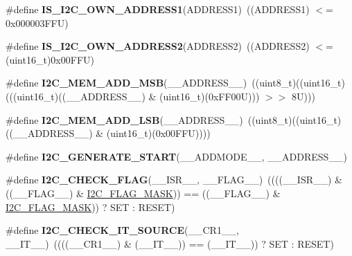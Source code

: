 \begin{DoxyCompactItemize}
\item 
\mbox{\label{group___i2_c___private___macro_gad84e8b9523d45b6105b4d5cb68994a79}} 
\#define {\bfseries I\+S\+\_\+\+I2\+C\+\_\+\+O\+W\+N\+\_\+\+A\+D\+D\+R\+E\+S\+S1}(A\+D\+D\+R\+E\+S\+S1)~((A\+D\+D\+R\+E\+S\+S1) $<$= 0x000003\+F\+F\+U)
\item 
\mbox{\label{group___i2_c___private___macro_ga83001d53612b83ee90730d3bb2732537}} 
\#define {\bfseries I\+S\+\_\+\+I2\+C\+\_\+\+O\+W\+N\+\_\+\+A\+D\+D\+R\+E\+S\+S2}(A\+D\+D\+R\+E\+S\+S2)~((A\+D\+D\+R\+E\+S\+S2) $<$= (uint16\+\_\+t)0x00\+F\+F\+U)
\item 
\mbox{\label{group___i2_c___private___macro_ga2e42fa55be22240dc5a54a0304d01cfb}} 
\#define {\bfseries I2\+C\+\_\+\+M\+E\+M\+\_\+\+A\+D\+D\+\_\+\+M\+SB}(\+\_\+\+\_\+\+A\+D\+D\+R\+E\+S\+S\+\_\+\+\_\+)~((uint8\+\_\+t)((uint16\+\_\+t)(((uint16\+\_\+t)((\+\_\+\+\_\+\+A\+D\+D\+R\+E\+S\+S\+\_\+\+\_\+) \& (uint16\+\_\+t)(0x\+F\+F00\+U))) $>$$>$ 8\+U)))
\item 
\mbox{\label{group___i2_c___private___macro_ga9c8f1a763307d0c37bb4e2dcfdf3bb9f}} 
\#define {\bfseries I2\+C\+\_\+\+M\+E\+M\+\_\+\+A\+D\+D\+\_\+\+L\+SB}(\+\_\+\+\_\+\+A\+D\+D\+R\+E\+S\+S\+\_\+\+\_\+)~((uint8\+\_\+t)((uint16\+\_\+t)((\+\_\+\+\_\+\+A\+D\+D\+R\+E\+S\+S\+\_\+\+\_\+) \& (uint16\+\_\+t)(0x00\+F\+F\+U))))
\item 
\#define {\bfseries I2\+C\+\_\+\+G\+E\+N\+E\+R\+A\+T\+E\+\_\+\+S\+T\+A\+RT}(\+\_\+\+\_\+\+A\+D\+D\+M\+O\+D\+E\+\_\+\+\_\+,  \+\_\+\+\_\+\+A\+D\+D\+R\+E\+S\+S\+\_\+\+\_\+)
\item 
\mbox{\label{group___i2_c___private___macro_ga31873e0595e29c80cffe00c2d2e073ab}} 
\#define {\bfseries I2\+C\+\_\+\+C\+H\+E\+C\+K\+\_\+\+F\+L\+AG}(\+\_\+\+\_\+\+I\+S\+R\+\_\+\+\_\+,  \+\_\+\+\_\+\+F\+L\+A\+G\+\_\+\+\_\+)~((((\+\_\+\+\_\+\+I\+S\+R\+\_\+\+\_\+) \& ((\+\_\+\+\_\+\+F\+L\+A\+G\+\_\+\+\_\+) \& \mbox{\hyperlink{group___i2_c___exported___macros_gafbc0a6e4113be03100fbae1314a8b395}{I2\+C\+\_\+\+F\+L\+A\+G\+\_\+\+M\+A\+SK}})) == ((\+\_\+\+\_\+\+F\+L\+A\+G\+\_\+\+\_\+) \& \mbox{\hyperlink{group___i2_c___exported___macros_gafbc0a6e4113be03100fbae1314a8b395}{I2\+C\+\_\+\+F\+L\+A\+G\+\_\+\+M\+A\+SK}})) ? S\+ET \+: R\+E\+S\+ET)
\item 
\mbox{\label{group___i2_c___private___macro_gacc7c83a67d99d759923c6907f1a1751f}} 
\#define {\bfseries I2\+C\+\_\+\+C\+H\+E\+C\+K\+\_\+\+I\+T\+\_\+\+S\+O\+U\+R\+CE}(\+\_\+\+\_\+\+C\+R1\+\_\+\+\_\+,  \+\_\+\+\_\+\+I\+T\+\_\+\+\_\+)~((((\+\_\+\+\_\+\+C\+R1\+\_\+\+\_\+) \& (\+\_\+\+\_\+\+I\+T\+\_\+\+\_\+)) == (\+\_\+\+\_\+\+I\+T\+\_\+\+\_\+)) ? S\+ET \+: R\+E\+S\+ET)
\end{DoxyCompactItemize}


